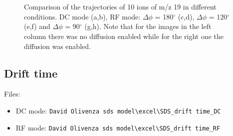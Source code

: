 \begin{figure}
\begin{center}
\\ \bigskip
{}
\\ \bigskip
\end{center}
\caption[Comparison of the trajectories of 10 ions of m/z 19 in different conditions]{Comparison of the trajectories of 10 ions of m/z 19 in different conditions. DC mode (a,b), RF mode: $\Delta \phi$ = 180$^{\circ}$ (c,d), $\Delta \phi$ = 120$^{\circ}$ (e,f) and $\Delta \phi$ = 90$^{\circ}$ (g,h). Note that for the images in the left column there was no diffusion enabled while for the right one the diffusion was enabled.
}\label{fig:traj}
\end{figure}


\subsection{Drift time}
Files:
\begin{itemize}
\item DC mode: \verb|David Olivenza sds model\excel\SDS_drift time_DC|
\item RF mode: \verb|David Olivenza sds model\excel\SDS_drift time_RF|
\end{itemize}

